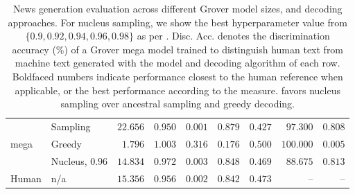 \documentclass{article}
\theoremstyle{definition}
\newcommand{\name}{{\fontfamily{bch}\selectfont{\textsc{Mauve}}}\xspace}
\newcommand{\tabemph}[1]{\cellcolor{lightmauve!30}\textcolor{black!50!royalazure}{#1}}%
\begin{document}
\begin{table}[t!]
\begin{adjustbox}{max width=0.95\textwidth}
\begin{tabular}{llrrrrrrr}
\multirow{3}{*}{mega} & Sampling &           $22.656$ &           $0.950$ &           $0.001$ &           $0.879$ &           $0.427$ &                     $97.300$ &                    $0.808$ \\
      & Greedy &            $1.796$ &           $1.003$ &           $0.316$ &           $0.176$ &           $0.500$ &                    $100.000$ &                    $0.005$ \\
      & Nucleus, $0.96$ &  \tabemph{$\mathbf{14.834}$} &           $0.972$ &           $0.003$ &           $0.848$ &  \tabemph{$\mathbf{0.469}$} &            \tabemph{$\mathbf{88.675}$} &           \tabemph{$\mathbf{0.813}$} \\
\midrule
Human &      n/a             &           $15.356$ &           $0.956$ &           $0.002$ &           $0.842$ &           $0.473$ &         --                     &        --                    \\
\bottomrule
\end{tabular}
 \end{adjustbox}
\caption{News generation evaluation across different Grover model sizes, and decoding approaches.
For nucleus sampling, we show the best hyperparameter value from $\{0.9, 0.92, 0.94, 0.96, 0.98\}$
as per \name.
Disc. Acc. denotes the discrimination accuracy (\%) of a Grover mega model trained to distinguish human text
from machine text generated with the model and decoding algorithm of each row. 
Boldfaced numbers indicate performance closest to the human reference when applicable, or the best performance according to the measure.
\name favors nucleus sampling over ancestral sampling and greedy decoding.
}
\label{tab:mauve:expt:grover-appendix}
\end{table}
\end{document}
